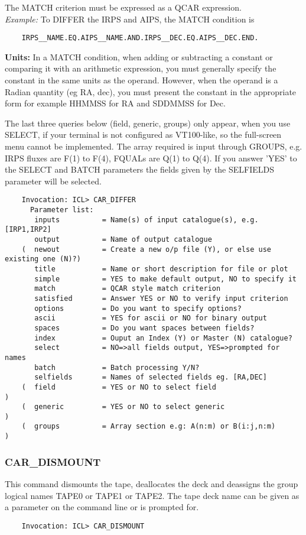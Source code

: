 The MATCH criterion must be expressed as a QCAR expression.\\
{\em Example:}  To DIFFER the IRPS and AIPS, the MATCH condition is
\begin{verbatim}
    IRPS__NAME.EQ.AIPS__NAME.AND.IRPS__DEC.EQ.AIPS__DEC.END.
\end{verbatim}
{\bf Units:} In a MATCH condition, when adding or subtracting a constant or
comparing it with an arithmetic expression, you must generally specify the
constant in the same units as the operand.
However, when the operand is a Radian quantity (eg RA, dec), you must present 
the constant in the appropriate form for example HHMMSS for RA
and SDDMMSS for Dec.

The last three queries below (field, generic, groups) only appear, when you use
SELECT, if your terminal is not configured as VT100-like, so the full-screen 
menu cannot be implemented.
The array required is input through GROUPS, e.g. IRPS fluxes are F(1) to 
F(4), FQUALs are Q(1) to Q(4).
If you answer 'YES' to the SELECT and BATCH parameters the fields given by the
SELFIELDS parameter will be selected.

\begin{verbatim}
    Invocation: ICL> CAR_DIFFER
      Parameter list:
       inputs          = Name(s) of input catalogue(s), e.g. [IRP1,IRP2]
       output          = Name of output catalogue
    (  newout          = Create a new o/p file (Y), or else use existing one (N)?)
       title           = Name or short description for file or plot
       simple          = YES to make default output, NO to specify it
       match           = QCAR style match criterion
       satisfied       = Answer YES or NO to verify input criterion
       options         = Do you want to specify options?
       ascii           = YES for ascii or NO for binary output
       spaces          = Do you want spaces between fields?
       index           = Ouput an Index (Y) or Master (N) catalogue?
       select          = NO=>all fields output, YES=>prompted for names
       batch           = Batch processing Y/N?
       selfields       = Names of selected fields eg. [RA,DEC]
    (  field           = YES or NO to select field                               )
    (  generic         = YES or NO to select generic                             )
    (  groups          = Array section e.g: A(n:m) or B(i:j,n:m)                 )
\end{verbatim}

\subsubsection{CAR\_DISMOUNT}
This command dismounts the tape, deallocates the deck and deassigns
the group logical names TAPE0 or TAPE1 or TAPE2.
The tape deck name can be given as a parameter on the command line or is
prompted for.
\begin{verbatim}
    Invocation: ICL> CAR_DISMOUNT
\end{verbatim}


